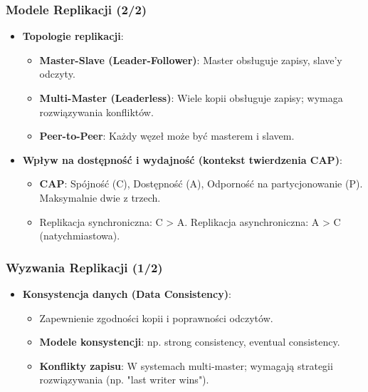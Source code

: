 \documentclass[aspectratio=169,xcolor=table]{beamer}
\begin{document}
\begin{frame}
  \frametitle{Modele Replikacji (2/2)}
  \begin{itemize}
    \item \textbf{Topologie replikacji}:
        \begin{itemize}
            \item \textbf{Master-Slave (Leader-Follower)}: Master obsługuje zapisy, slave'y odczyty.
            \item \textbf{Multi-Master (Leaderless)}: Wiele kopii obsługuje zapisy; wymaga rozwiązywania konfliktów.
            \item \textbf{Peer-to-Peer}: Każdy węzeł może być masterem i slavem.
        \end{itemize}
    \item \textbf{Wpływ na dostępność i wydajność (kontekst twierdzenia CAP)}:
        \begin{itemize}
            \item \textbf{CAP}: Spójność (C), Dostępność (A), Odporność na partycjonowanie (P). Maksymalnie dwie z trzech.
            \item Replikacja synchroniczna: C > A. Replikacja asynchroniczna: A > C (natychmiastowa).
        \end{itemize}
  \end{itemize}
\end{frame}

\begin{frame}
  \frametitle{Wyzwania Replikacji (1/2)}
  \begin{itemize}
    \item \textbf{Konsystencja danych (Data Consistency)}:
        \begin{itemize}
            \item Zapewnienie zgodności kopii i poprawności odczytów.
            \item \textbf{Modele konsystencji}: np. strong consistency, eventual consistency.
            \item \textbf{Konflikty zapisu}: W systemach multi-master; wymagają strategii rozwiązywania (np. "last writer wins").
        \end{itemize}
  \end{itemize}
\end{frame}
\end{document}
